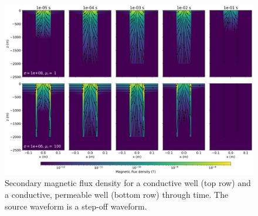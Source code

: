 \begin{figure}
    \begin{center}
    \includegraphics[width=\columnwidth]{figures/casing_software/btdem.png}
    \end{center}
\caption{
    Secondary magnetic flux density for a conductive well (top row) and a conductive, permeable well (bottom row) through time.
    The source waveform is a step-off waveform.
}
\label{fig:btdem}
\end{figure}
